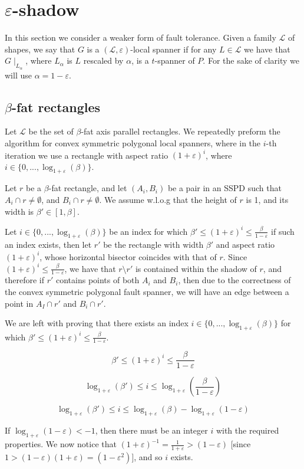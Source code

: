 \documentclass{article}
\newcommand{\eps}{\varepsilon}
\newcommand{\LL}{\mathcal{L}}
\begin{document}
	\section{$\eps$-shadow}
	
	In this section we consider a weaker form of fault tolerance. Given a family $\LL$ of shapes, we say that $G$ is a $(\LL,\eps)$-local spanner if for any $L\in\LL$ we have that $G\mid_{L_{\alpha}}$, where $L_{\alpha}$ is $L$ rescaled by $\alpha$, is a $t$-spanner of $P$. For the sake of clarity we will use $\alpha = 1-\eps$.
	
	\subsection{$\beta$-fat rectangles}
	Let $\LL$ be the set of $\beta$-fat axis parallel rectangles. We repeatedly preform the algorithm for convex symmetric polygonal local spanners, where in the $i$-th iteration we use a rectangle with aspect ratio $\left(1+\eps\right)^i$, where $i\in\{0,...,\log_{1+\eps}(\beta)\}$. 
	
	Let $r$ be a $\beta$-fat rectangle, and let $(A_i,B_i)$ be a pair in an SSPD such that $A_i\cap r\neq \emptyset$, and $B_i\cap r\neq \emptyset$. We assume w.l.o.g that the height of $r$ is 1, and its width is $\beta'\in [1,\beta]$.

	Let $i\in \{0,...,\log_{1+\eps}(\beta)\}$ be an index for which $\beta' \leq (1+\eps)^i \leq \frac{\beta}{1-\eps}$ if such an index exists, then let $r'$ be the rectangle with width $\beta'$ and aspect ratio $(1+\eps)^i$, whose horizontal bisector coincides with that of $r$. Since $(1+\eps)^i \leq \frac{\beta}{1-\eps}$, we have that $r\setminus r'$ is contained within the shadow of $r$, and therefore if $r'$ contains points of both $A_i$ and $B_i$, then due to the correctness of the convex symmetric polygonal fault spanner, we will have an edge between a point in $A_I\cap r'$ and $B_i\cap r'$.
	
	We are left with proving that there exists an index $i\in \{0,...,\log_{1+\eps}(\beta)\}$ for which $\beta' \leq (1+\eps)^i \leq \frac{\beta}{1-\eps}$.
	
	$$\beta' \leq (1+\eps)^i \leq \frac{\beta}{1-\eps}$$
	
	$$\log_{1+\eps}(\beta') \leq i \leq \log_{1+\eps}\left(\frac{\beta}{1-\eps}\right)$$
	
	$$\log_{1+\eps}(\beta') \leq i \leq \log_{1+\eps}(\beta) - \log_{1+\eps}(1-\eps)$$
	
	If $\log_{1+\eps}(1-\eps)<-1$, then there must be an integer $i$ with the required properties. We now notice that $(1+\eps)^{-1}=\frac{1}{1+\eps}>(1-\eps)$ [since $1>(1-\eps)(1+\eps)=(1-\eps^2)$], and so $i$ exists.
	
\end{document}
